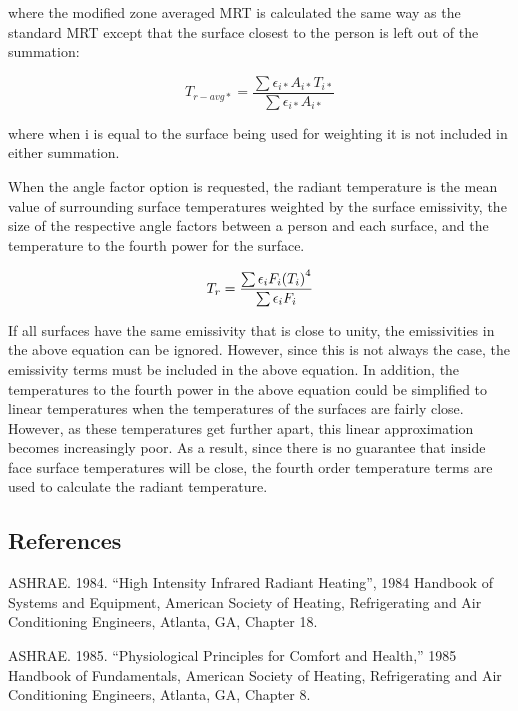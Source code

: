 where the modified zone averaged MRT is calculated the same way as the standard MRT except that the surface closest to the person is left out of the summation:

\begin{equation}
{T_{r - avg*}} = \frac{\sum{{{\epsilon}_{i*}}{{A}_{i*}}{{T}_{i*}}}}{\sum{{{\epsilon}_{i*}}{{A}_{i*}}}}
\end{equation}

where when i is equal to the surface being used for weighting it is not included in either summation.

When the angle factor option is requested, the radiant temperature is the mean value of surrounding surface temperatures weighted by the surface emissivity, the size of the respective angle factors between a person and each surface, and the temperature to the fourth power for the surface.

\begin{equation}
{T_r} = \frac{\sum{{\epsilon_{i}}{F_{i}}{\left({T_{i}}\right)^4}}}{\sum{{\epsilon_{i}}{F_{i}}}}
\end{equation}

If all surfaces have the same emissivity that is close to unity, the emissivities in the above equation can be ignored.  However, since this is not always the case, the emissivity terms must be included in the above equation.  In addition, the temperatures to the fourth power in the above equation could be simplified to linear temperatures when the temperatures of the surfaces are fairly close.  However, as these temperatures get further apart, this linear approximation becomes increasingly poor.  As a result, since there is no guarantee that inside face surface temperatures will be close, the fourth order temperature terms are used to calculate the radiant temperature.

\subsection{References}\label{references-1-012}

ASHRAE. 1984. ``High Intensity Infrared Radiant Heating'', 1984 Handbook of Systems and Equipment, American Society of Heating, Refrigerating and Air Conditioning Engineers, Atlanta, GA, Chapter 18.

ASHRAE. 1985. ``Physiological Principles for Comfort and Health,'' 1985 Handbook of Fundamentals, American Society of Heating, Refrigerating and Air Conditioning Engineers, Atlanta, GA, Chapter 8.

